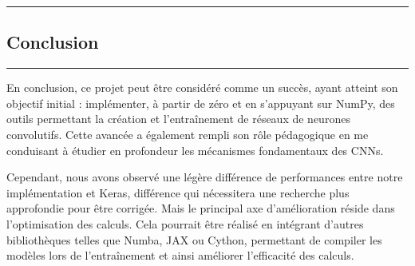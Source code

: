 {\color{gray}\hrule}
\begin{center}
\section{Conclusion}
\bigskip
\end{center}
{\color{gray}\hrule}
\vspace{0.5cm}

En conclusion, ce projet peut être considéré comme un succès, ayant atteint son objectif initial : 
implémenter, à partir de zéro et en s’appuyant sur NumPy, des outils permettant la création et 
l’entraînement de réseaux de neurones convolutifs. Cette avancée a également rempli son rôle 
pédagogique en me conduisant à étudier en profondeur les mécanismes fondamentaux des CNNs.

Cependant, nous avons observé une légère différence de performances 
entre notre implémentation et Keras, différence qui nécessitera une recherche plus approfondie pour être corrigée. 
Mais le principal axe d’amélioration réside dans l’optimisation des calculs. Cela pourrait être réalisé 
en intégrant d’autres bibliothèques telles que Numba, JAX ou Cython, permettant de compiler les modèles lors 
de l’entraînement et ainsi améliorer l’efficacité des calculs. \\